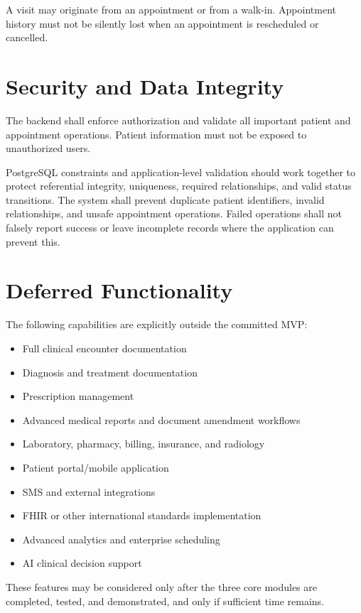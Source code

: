 \documentclass[11pt,a4paper]{article}
\begin{document}
A visit may originate from an appointment or from a walk-in. Appointment history must not be silently lost when an appointment is rescheduled or cancelled.

\section{Security and Data Integrity}
The backend shall enforce authorization and validate all important patient and appointment operations. Patient information must not be exposed to unauthorized users.

PostgreSQL constraints and application-level validation should work together to protect referential integrity, uniqueness, required relationships, and valid status transitions. The system shall prevent duplicate patient identifiers, invalid relationships, and unsafe appointment operations. Failed operations shall not falsely report success or leave incomplete records where the application can prevent this.

\section{Deferred Functionality}
The following capabilities are explicitly outside the committed MVP:
\begin{itemize}
    \item Full clinical encounter documentation
    \item Diagnosis and treatment documentation
    \item Prescription management
    \item Advanced medical reports and document amendment workflows
    \item Laboratory, pharmacy, billing, insurance, and radiology
    \item Patient portal/mobile application
    \item SMS and external integrations
    \item FHIR or other international standards implementation
    \item Advanced analytics and enterprise scheduling
    \item AI clinical decision support
\end{itemize}

These features may be considered only after the three core modules are completed, tested, and demonstrated, and only if sufficient time remains.
\end{document}
